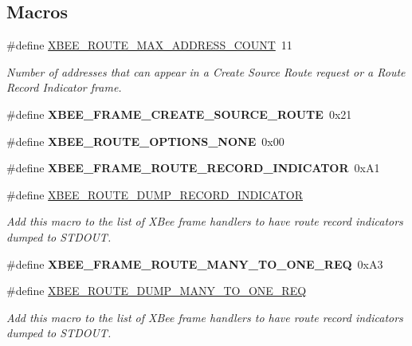 \subsection*{Macros}
\begin{DoxyCompactItemize}
\item 
\#define \hyperlink{group__xbee__route_ga41b7c2f8ef5f6e4912572871790611d2}{X\-B\-E\-E\-\_\-\-R\-O\-U\-T\-E\-\_\-\-M\-A\-X\-\_\-\-A\-D\-D\-R\-E\-S\-S\-\_\-\-C\-O\-U\-N\-T}~11
\begin{DoxyCompactList}\small\item\em Number of addresses that can appear in a Create Source Route request or a Route Record Indicator frame. \end{DoxyCompactList}\item 
\hypertarget{group__xbee__route_ga02ffd9f293667654c35729ed10f8fd9e}{\#define {\bfseries X\-B\-E\-E\-\_\-\-F\-R\-A\-M\-E\-\_\-\-C\-R\-E\-A\-T\-E\-\_\-\-S\-O\-U\-R\-C\-E\-\_\-\-R\-O\-U\-T\-E}~0x21}\label{group__xbee__route_ga02ffd9f293667654c35729ed10f8fd9e}

\item 
\hypertarget{group__xbee__route_ga81c8e8cbc36d6ba3448196796f442ac7}{\#define {\bfseries X\-B\-E\-E\-\_\-\-R\-O\-U\-T\-E\-\_\-\-O\-P\-T\-I\-O\-N\-S\-\_\-\-N\-O\-N\-E}~0x00}\label{group__xbee__route_ga81c8e8cbc36d6ba3448196796f442ac7}

\item 
\hypertarget{group__xbee__route_ga0167412988c6533938c3a0f9db200054}{\#define {\bfseries X\-B\-E\-E\-\_\-\-F\-R\-A\-M\-E\-\_\-\-R\-O\-U\-T\-E\-\_\-\-R\-E\-C\-O\-R\-D\-\_\-\-I\-N\-D\-I\-C\-A\-T\-O\-R}~0x\-A1}\label{group__xbee__route_ga0167412988c6533938c3a0f9db200054}

\item 
\#define \hyperlink{group__xbee__route_ga47ed8d34bae2282e8397becffbe212fb}{X\-B\-E\-E\-\_\-\-R\-O\-U\-T\-E\-\_\-\-D\-U\-M\-P\-\_\-\-R\-E\-C\-O\-R\-D\-\_\-\-I\-N\-D\-I\-C\-A\-T\-O\-R}
\begin{DoxyCompactList}\small\item\em Add this macro to the list of X\-Bee frame handlers to have route record indicators dumped to S\-T\-D\-O\-U\-T. \end{DoxyCompactList}\item 
\hypertarget{group__xbee__route_ga7769894d4361b0c0f2025f0a6bee70ae}{\#define {\bfseries X\-B\-E\-E\-\_\-\-F\-R\-A\-M\-E\-\_\-\-R\-O\-U\-T\-E\-\_\-\-M\-A\-N\-Y\-\_\-\-T\-O\-\_\-\-O\-N\-E\-\_\-\-R\-E\-Q}~0x\-A3}\label{group__xbee__route_ga7769894d4361b0c0f2025f0a6bee70ae}

\item 
\#define \hyperlink{group__xbee__route_gab9293f39692e0bc50896eed12ef89d4e}{X\-B\-E\-E\-\_\-\-R\-O\-U\-T\-E\-\_\-\-D\-U\-M\-P\-\_\-\-M\-A\-N\-Y\-\_\-\-T\-O\-\_\-\-O\-N\-E\-\_\-\-R\-E\-Q}
\begin{DoxyCompactList}\small\item\em Add this macro to the list of X\-Bee frame handlers to have route record indicators dumped to S\-T\-D\-O\-U\-T. \end{DoxyCompactList}\end{DoxyCompactItemize}
